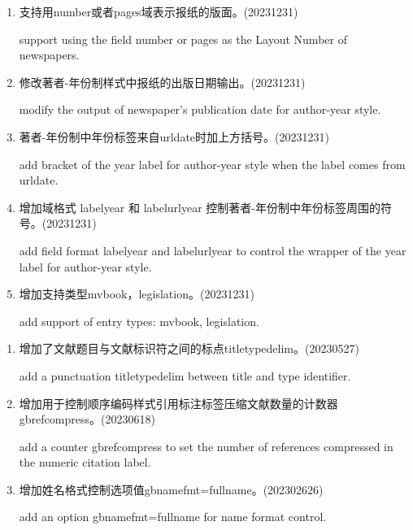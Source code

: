 \label{up:20240210}
\begin{enumerate}

\item 支持用number或者pages域表示报纸的版面。(20231231)

support using the field number or pages as the Layout Number of newspapers.

\item 修改著者-年份制样式中报纸的出版日期输出。(20231231)

modify the output of newspaper's publication date for author-year style.

\item 著者-年份制中年份标签来自urldate时加上方括号。(20231231)

add bracket of the year label for author-year style when the label comes from urldate.

\item 增加域格式 labelyear 和 labelurlyear 控制著者-年份制中年份标签周围的符号。(20231231)

add field format labelyear and labelurlyear to control the wrapper of the year label for author-year style.

\item 增加支持类型mvbook，legislation。(20231231)

add support of entry types: mvbook, legislation.

\end{enumerate}



\label{up:20230910}
\begin{enumerate}

\item 增加了文献题目与文献标识符之间的标点titletypedelim。(20230527)

add a punctuation titletypedelim between title and type identifier.

\item 增加用于控制顺序编码样式引用标注标签压缩文献数量的计数器gbrefcompress。(20230618)

add a counter gbrefcompress to set the number of references compressed in the numeric citation label.

\item 增加姓名格式控制选项值gbnamefmt=fullname。(202302626)

add an option gbnamefmt=fullname for name format control.


\end{enumerate}


